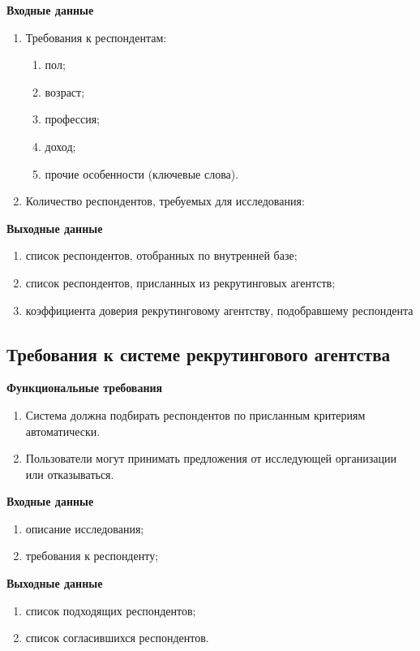 \textbf{Входные данные}
\begin{enumerate}
\item Требования к респондентам:
\begin{enumerate}
\item пол;
\item возраст;
\item профессия;
\item доход;
\item прочие особенности (ключевые слова).
\end{enumerate}
\item Количество респондентов, требуемых для исследования:
\end{enumerate}

\textbf{Выходные данные}
\begin{enumerate}
\item список респондентов, отобранных по внутренней базе;
\item список респондентов, присланных из рекрутинговых агентств;
\item коэффициента доверия рекрутинговому агентству, подобравшему респондента
\end{enumerate}

\subsection{Требования к системе рекрутингового агентства}

\textbf{Функциональные требования}
\begin{enumerate}
\item Система должна подбирать респондентов по присланным критериям автоматически.
\item Пользователи могут принимать предложения от исследующей организации или отказываться.
\end{enumerate}

\textbf{Входные данные}
\begin{enumerate}
\item описание исследования;
\item требования к респонденту;
\end{enumerate}

\textbf{Выходные данные}
\begin{enumerate}
\item список подходящих респондентов;
\item список согласившихся респондентов.
\end{enumerate}

